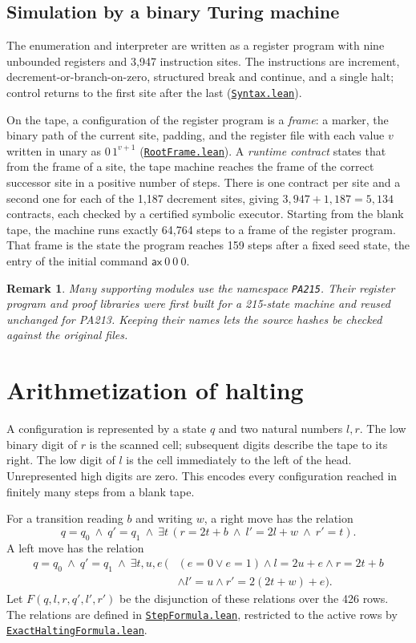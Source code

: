 \documentclass[11pt,letterpaper]{article}
\newtheorem{remark}[theorem]{Remark}
\newcommand{\src}[2]{\href{https://github.com/jamesyc/BusyBeaver/blob/034d08df73b94e9f4036fc5af74b694eb73afc67/#1}{\texttt{\nolinkurl{#2}}}}
\begin{document}
\subsection{Simulation by a binary Turing machine}

The enumeration and interpreter are written as a register program with
nine unbounded registers and 3,947 instruction sites. The instructions are
increment, decrement-or-branch-on-zero, structured break and continue,
and a single halt; control returns to the first site after the last
(\src{Lean/PA215/Source/Syntax.lean}{Syntax.lean}).

On the tape, a configuration of the register program is a \emph{frame}:
a marker, the binary path of the current site, padding, and the register
file with each value $v$ written in unary as $0\,1^{v+1}$
(\src{Lean/PA215/Source/RootFrame.lean}{RootFrame.lean}). A \emph{runtime
contract} states that from the frame of a site, the tape machine reaches
the frame of the correct successor site in a positive number of steps.
There is one contract per site and a second one for each of the 1,187
decrement sites, giving $3{,}947+1{,}187=5{,}134$ contracts, each checked
by a certified symbolic executor. Starting from the blank tape, the
machine runs exactly 64,764 steps to a frame of the register program. That
frame is the state the program reaches 159 steps after a fixed seed state,
the entry of the initial command $\mathsf{ax}\ 0\ 0\ 0$.

\begin{remark}
Many supporting modules use the namespace \texttt{PA215}. Their register
program and proof libraries were first built for a 215-state machine and
reused unchanged for PA213. Keeping their names lets the source hashes be
checked against the original files.
\end{remark}

\section{Arithmetization of halting}\label{sec:encoding}

A configuration is represented by a state $q$ and two natural numbers
$l,r$. The low binary digit of $r$ is the scanned cell; subsequent digits
describe the tape to its right. The low digit of $l$ is the cell immediately
to the left of the head. Unrepresented high digits are zero. This encodes
every configuration reached in finitely many steps from a blank tape.

For a transition reading $b$ and writing $w$, a right move has the relation
\[
q=q_0\ \land\ q'=q_1\ \land\
\exists t\,(r=2t+b\ \land\ l'=2l+w\ \land\ r'=t).
\]
A left move has the relation
\begin{align*}
q=q_0\ \land\ q'=q_1\ \land\ \exists t,u,e\,(& (e=0\lor e=1)
\land l=2u+e\land r=2t+b\\
&\land l'=u\land r'=2(2t+w)+e).
\end{align*}
Let $F(q,l,r,q',l',r')$ be the disjunction of these relations over the
426 rows. The relations are defined in
\src{Lean/metamathematics/PA213PA/StepFormula.lean}{StepFormula.lean},
restricted to the active rows by
\src{Lean/metamathematics/PA213PA/ExactHaltingFormula.lean}{ExactHaltingFormula.lean}.
\end{document}
